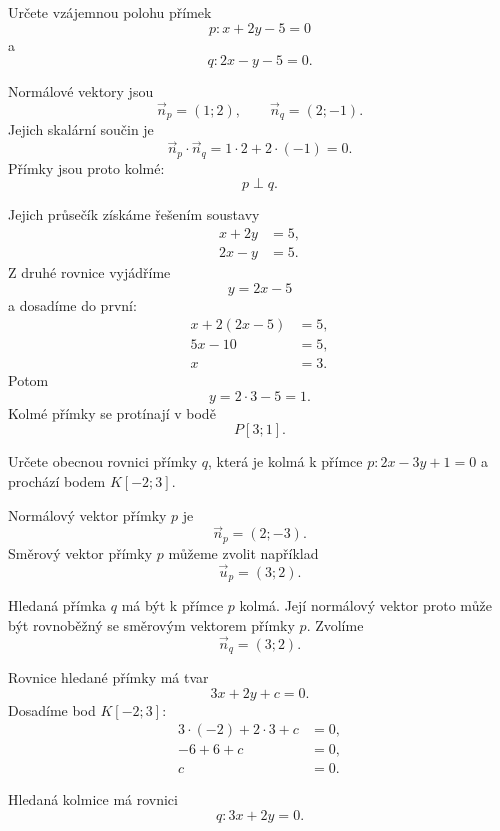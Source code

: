 \begin{example}\label{exa:Perpendicular_general_lines}
    Určete vzájemnou polohu přímek
    \[
        p:x+2y-5=0
    \]
    a
    \[
        q:2x-y-5=0.
    \]

    Normálové vektory jsou
    \[
        \vec{n}_p=(1;2),
        \qquad
        \vec{n}_q=(2;-1).
    \]
    Jejich skalární součin je
    \[
        \vec{n}_p\cdot\vec{n}_q
        =
        1\cdot2+2\cdot(-1)
        =
        0.
    \]
    Přímky jsou proto kolmé:
    \[
        p\perp q.
    \]

    Jejich průsečík získáme řešením soustavy
    \begin{align*}
        x+2y&=5,\\
        2x-y&=5.
    \end{align*}
    Z druhé rovnice vyjádříme
    \[
        y=2x-5
    \]
    a dosadíme do první:
    \begin{align*}
        x+2(2x-5)&=5,\\
        5x-10&=5,\\
        x&=3.
    \end{align*}
    Potom
    \[
        y=2\cdot3-5=1.
    \]
    Kolmé přímky se protínají v bodě
    \[
        P[3;1].
    \]
\end{example}

\begin{example}\label{exa:Perpendicular_general_line_through_point}
    Určete obecnou rovnici přímky $q$, která je kolmá k přímce $p:2x-3y+1=0$ a prochází bodem $K[-2;3]$.
    
    Normálový vektor přímky $p$ je
    \[
        \vec{n}_p=(2;-3).
    \]
    Směrový vektor přímky $p$ můžeme zvolit například
    \[
        \vec{u}_p=(3;2).
    \]

    Hledaná přímka $q$ má být k přímce $p$ kolmá. Její normálový vektor
    proto může být rovnoběžný se směrovým vektorem přímky $p$. Zvolíme
    \[
        \vec{n}_q=(3;2).
    \]

    Rovnice hledané přímky má tvar
    \[
        3x+2y+c=0.
    \]
    Dosadíme bod $K[-2;3]$:
    \begin{align*}
        3\cdot(-2)+2\cdot3+c&=0,\\
        -6+6+c&=0,\\
        c&=0.
    \end{align*}

    Hledaná kolmice má rovnici
    \[
        q:3x+2y=0.
    \]
\end{example}
